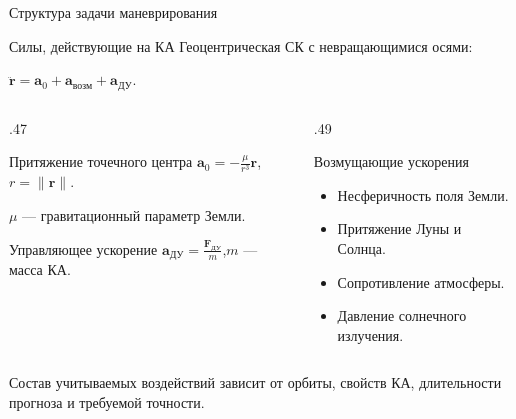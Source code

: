 \documentclass[11pt,aspectratio=169,t]{beamer}
\begin{document}
\begin{frame}{Структура задачи маневрирования}
\centering

\end{frame}

\begin{frame}{Силы, действующие на КА}
Геоцентрическая СК с невращающимися осями:
\par\smallskip
\centerline{$\displaystyle\ddot{\mathbf r}=\mathbf a_0+\mathbf a_{\text{возм}}+\mathbf a_{\text{ДУ}}.$}
\begin{columns}[T,onlytextwidth]
\begin{column}{.47\textwidth}
\begin{block}{Притяжение точечного центра}
$\displaystyle\mathbf a_0=-\frac{\mu}{r^3}\mathbf r$,\quad $r=\|\mathbf r\|$.
\par\smallskip
$\mu$ --- гравитационный параметр Земли.
\end{block}
\begin{block}{Управляющее ускорение}
$\displaystyle\mathbf a_{\text{ДУ}}=\frac{\mathbf F_{\text{ДУ}}}{m}$,\quad $m$ --- масса КА.
\end{block}
\end{column}
\begin{column}{.49\textwidth}
\begin{block}{Возмущающие ускорения}
\begin{itemize}
\item Несферичность поля Земли.
\item Притяжение Луны и Солнца.
\item Сопротивление атмосферы.
\item Давление солнечного излучения.
\end{itemize}
\end{block}
\end{column}
\end{columns}
Состав учитываемых воздействий зависит от орбиты, свойств КА, длительности прогноза и требуемой точности.
\end{frame}
\end{document}
